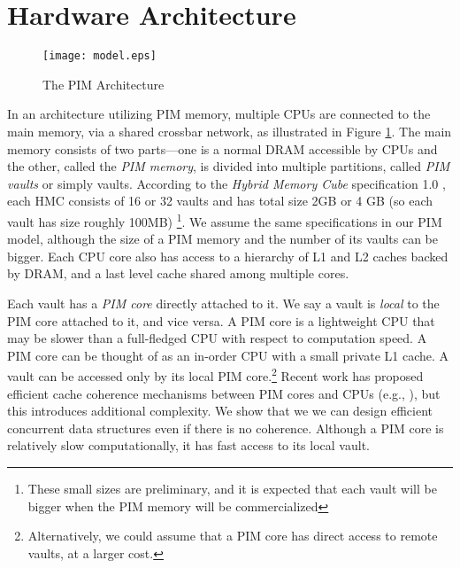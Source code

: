 \section{Hardware Architecture}


\label{section:hardware_model}

\begin{figure}[ht!]
\centering
\texttt{[image: model.eps]}
\caption{The PIM Architecture}
\label{figure:model}
\end{figure}

In an architecture utilizing PIM memory, multiple CPUs are connected to the main
memory, via a shared crossbar network, as illustrated in Figure \ref{figure:model}.
The main memory consists of two parts---one is a normal DRAM accessible by CPUs 
and the other, called the \textit{PIM memory}, is divided into multiple partitions, 
called \textit{PIM vaults} or simply vaults.  
According to the \textit{Hybrid Memory Cube} specification 1.0 \cite{website:HMC}, 
each HMC consists of 16 or 
32 vaults and has total size 2GB or 4 GB (so each vault has size roughly 100MB) 
\footnote{These small sizes are preliminary, and it is expected that each vault will be bigger when the 
PIM memory will be commercialized}. 
We assume the same specifications in our PIM model, although the size of a PIM memory and 
the number of its vaults can be bigger. 
Each CPU core also has access to a hierarchy of L1 and L2 caches backed by DRAM,
and a last level cache shared among multiple cores. 

Each vault has a \textit{PIM core} directly attached to it.
We say a vault is \textit{local} to the PIM core attached to it, and vice versa.
A PIM core is a lightweight CPU that may be slower than a full-fledged CPU
with respect to computation speed. 
A PIM core can be thought of as an in-order CPU with a small private L1 cache.
A vault can be accessed only by its local PIM core.\footnote{
Alternatively, we could assume that a PIM core has direct access to remote vaults, at a larger cost. }
Recent work has proposed efficient cache coherence mechanisms between PIM cores and 
CPUs  
(e.g., \cite{boroumand2016, Ahn2015:1}), but this introduces additional complexity. 
We show that we 
we can  
design efficient concurrent data structures even if there is no coherence.
Although a PIM core is relatively slow computationally, it has fast access to its local vault.

